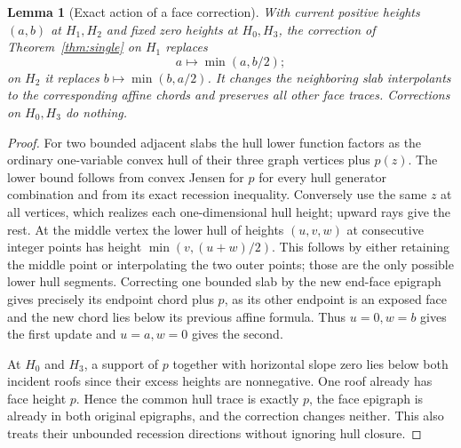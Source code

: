 \documentclass[11pt]{article}
\newtheorem{lemma}[theorem]{Lemma}
\begin{document}
\begin{lemma}[Exact action of a face correction]\label{lem:update}
With current positive heights $(a,b)$ at $H_1,H_2$ and fixed zero heights at $H_0,H_3$, the correction of Theorem~\ref{thm:single} on $H_1$ replaces
\[
 a\longmapsto\min(a,b/2);
\]
on $H_2$ it replaces $b\longmapsto\min(b,a/2)$. It changes the neighboring slab interpolants to the corresponding affine chords and preserves all other face traces. Corrections on $H_0,H_3$ do nothing.
\end{lemma}
\begin{proof}
For two bounded adjacent slabs the hull lower function factors as the ordinary one-variable convex hull of their three graph vertices plus $p(z)$. The lower bound follows from convex Jensen for $p$ for every hull generator combination and from its exact recession inequality. Conversely use the same $z$ at all vertices, which realizes each one-dimensional hull height; upward rays give the rest. At the middle vertex the lower hull of heights $(u,v,w)$ at consecutive integer points has height $\min(v,(u+w)/2)$. This follows by either retaining the middle point or interpolating the two outer points; those are the only possible lower hull segments. Correcting one bounded slab by the new end-face epigraph gives precisely its endpoint chord plus $p$, as its other endpoint is an exposed face and the new chord lies below its previous affine formula. Thus $u=0,w=b$ gives the first update and $u=a,w=0$ gives the second.

At $H_0$ and $H_3$, a support of $p$ together with horizontal slope zero lies below both incident roofs since their excess heights are nonnegative. One roof already has face height $p$. Hence the common hull trace is exactly $p$, the face epigraph is already in both original epigraphs, and the correction changes neither. This also treats their unbounded recession directions without ignoring hull closure.
\end{proof}
\end{document}
